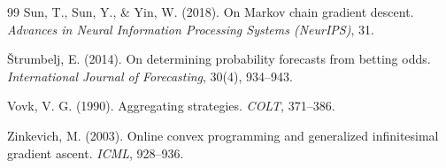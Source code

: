 \documentclass[12pt,a4paper,oneside]{report}
\renewcommand{\_}{\oldunderscore\allowbreak}
\theoremstyle{definition}
\theoremstyle{plain}
\theoremstyle{remark}
\begin{document}
\begin{thebibliography}{99}
 Sun, T., Sun, Y., \& Yin, W. (2018). On Markov chain gradient descent.
\emph{Advances in Neural Information Processing Systems (NeurIPS)}, 31.

 Štrumbelj, E. (2014). On determining probability forecasts from
betting odds. \emph{International Journal of Forecasting}, 30(4), 934--943.

 Vovk, V. G. (1990). Aggregating strategies. \emph{COLT}, 371--386.

 Zinkevich, M. (2003). Online convex programming and generalized
infinitesimal gradient ascent. \emph{ICML}, 928--936.

\end{thebibliography}
\end{document}
